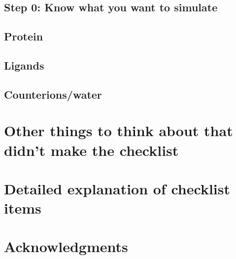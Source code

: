 \documentclass[9pt]{livecoms}
\begin{document}
\subsection{ Step 0: Know what you want to simulate }

\subsection{Protein} 

\subsection{Ligands}

\subsection{Counterions/water}

\section{Other things to think about that didn't make the checklist}



\section{Detailed explanation of checklist items}


\section{Acknowledgments}




\end{document}
